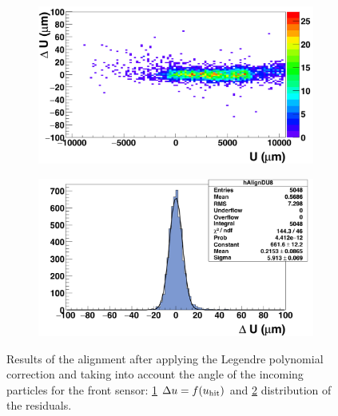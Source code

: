 \begin{figure}[!h]
        \begin{subfigure}[t]{0.45\textwidth}
          \centering
          \includegraphics[width = 1.2\textwidth]{Pictures/deformation/deltaUU_8_corrected1.png}
          \caption{}
          \label{fig:scatterDUU_corrected_front}
        \end{subfigure}
        \hfill
        \begin{subfigure}[t]{0.45\textwidth}
          \centering
          \includegraphics[width = 1.2\textwidth]{Pictures/deformation/deltaU_8_corrected1.png}
          \caption{}
          \label{fig:residualU_corrected}
        \end{subfigure}
        \caption{Results of the alignment after applying the Legendre polynomial correction and taking into account the angle of the incoming particles for the front sensor: \ref{fig:scatterDUU_corrected_front} $\Delta u=f(u_{\rm{hit}})$ and \ref{fig:residualU_corrected} distribution of the residuals.}
        \label{fig:alignmnetCorrected}

      \end{figure}

